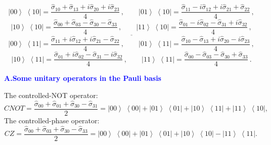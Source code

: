 \documentclass[12pt,a4paper,twoside]{article}      %
\newcommand{\ketbra}[2]{{\ensuremath {\left|#1\right\rangle\!\;\!\!\left\langle#2\right|}}}
\begin{document}
\begin{equation}\label{}
\ketbra{00}{10}= \frac{\hat{\sigma}_{10}+ \hat{\sigma}_{13}+ i\hat{\sigma}_{20}+ i\hat{\sigma}_{23}}{4}\,,
\qquad
\ketbra{01}{10}= \frac{\hat{\sigma}_{11}- i\hat{\sigma}_{12}+ i\hat{\sigma}_{21}+ \hat{\sigma}_{22}}{4}\,,
\nonumber
\end{equation}
\begin{equation}\label{}
\ketbra{10}{10}= \frac{\hat{\sigma}_{00}+ \hat{\sigma}_{03}- \hat{\sigma}_{30}- \hat{\sigma}_{33}}{4}\,,
\qquad
\ketbra{11}{10}= \frac{\hat{\sigma}_{01}- i\hat{\sigma}_{02}- \hat{\sigma}_{31}+ i\hat{\sigma}_{32}}{4}\,,
\nonumber
\end{equation}
$$\underline{\hspace{6cm}}$$\vspace{0.2ex}
\begin{equation}\label{}
\ketbra{00}{11}= \frac{\hat{\sigma}_{11}+ i\hat{\sigma}_{12}+ i\hat{\sigma}_{21}- \hat{\sigma}_{22}}{4}\,,
\qquad
\ketbra{01}{11}= \frac{\hat{\sigma}_{10}- \hat{\sigma}_{13}+ i\hat{\sigma}_{20}- i\hat{\sigma}_{23}}{4}\,,
\nonumber
\end{equation}
\begin{equation}\label{}
\ketbra{10}{11}= \frac{\hat{\sigma}_{01}+ i\hat{\sigma}_{02}- \hat{\sigma}_{31}- i\hat{\sigma}_{32}}{4}\,,
\qquad
\ketbra{11}{11}= \frac{\hat{\sigma}_{00}- \hat{\sigma}_{03}- \hat{\sigma}_{30}+ \hat{\sigma}_{33}}{4}\,.
\nonumber
\end{equation}

\addtocounter{A}{1}

\vspace{3ex}
\noindent
{\large\bf{\textcolor{blue}{A.\;\;Some unitary operators in the Pauli basis}}}
\vspace{2ex}

\noindent The controlled-NOT operator:
\begin{equation}\label{CNOT}
CNOT= \frac{\hat{\sigma}_{00}+ \hat{\sigma}_{01}+ \hat{\sigma}_{30}- \hat{\sigma}_{31}}{2}=
\ketbra{00}{00}+ \ketbra{01}{01}+ \ketbra{10}{11}+ \ketbra{11}{10},
\end{equation}
\noindent The controlled-phase operator:
\begin{equation}\label{}
CZ= \frac{\hat{\sigma}_{00}+ \hat{\sigma}_{03}+ \hat{\sigma}_{30}- \hat{\sigma}_{33}}{2}=
\ketbra{00}{00}+ \ketbra{01}{01}+ \ketbra{10}{10}- \ketbra{11}{11}.\,
\nonumber
\end{equation}
\end{document}
